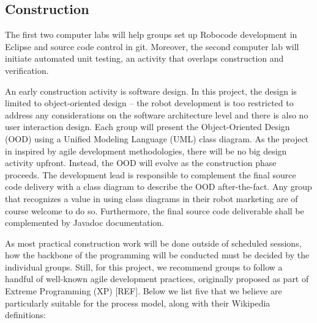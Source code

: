 \documentclass{scrreprt}
\begin{document}
\subsection{Construction} \label{sec:constr}
The first two computer labs will help groups set up Robocode development in Eclipse and source code control in git. Moreover, the second computer lab will initiate automated unit testing, an activity that overlaps construction and verification.

An early construction activity is software design. In this project, the design is limited to object-oriented design -- the robot development is too restricted to address any considerations on the software architecture level and there is also no user interaction design. Each group will present the Object-Oriented Design (OOD) using a Unified Modeling Language (UML) class diagram. As the project in inspired by agile development methodologies, there will be no big design activity upfront. Instead, the OOD will evolve as the construction phase proceeds. The development lead is responsible to complement the final source code delivery with a class diagram to describe the OOD after-the-fact. Any group that recognizes a value in using class diagrams in their  robot marketing are of course welcome to do so. Furthermore, the final source code deliverable shall be complemented by Javadoc documentation.  

As most practical construction work will be done outside of scheduled sessions, how the backbone of the programming will be conducted must be decided by the individual groups. Still, for this project, we recommend groups to follow a handful of well-known agile development practices, originally proposed as part of Extreme Programming (XP) [REF]. Below we list five that we believe are particularly suitable for the process model, along with their Wikipedia definitions:
\end{document}
